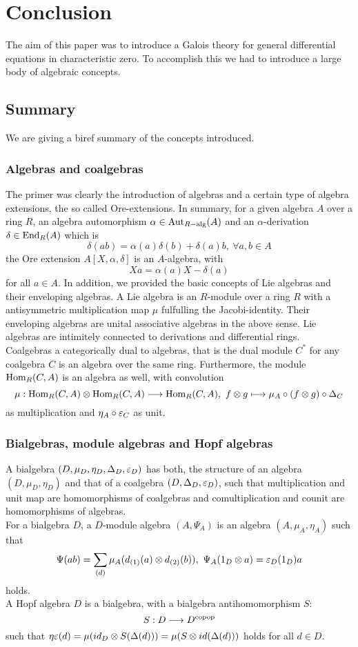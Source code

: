 \section{Conclusion}
The aim of this paper was to introduce a Galois theory for general differential equations in characteristic zero. To accomplish this we had to introduce a large body of algebraic concepts.
\subsection{Summary}
We are giving a biref summary of the concepts introduced.
\subsubsection{Algebras and coalgebras}
The primer was clearly the introduction of algebras and a certain type of algebra extensions, the so called Ore-extensions. In summary, for a given algebra $A$ over a ring $R$, an algebra automorphism $\alpha \in \mathrm{Aut}_{R-\mathrm{alg}}(A)$ and an $\alpha$-derivation $\delta \in \mathrm{End}_R(A)$ which is
$$\delta(a b) = \alpha(a) \delta(b) + \delta(a) b,\ \forall a, b \in A$$
the Ore extension $A[X,\alpha,\delta]$ is an $A$-algebra, with
$$X a = \alpha(a) X - \delta(a)$$
for all $a \in A$. In addition, we provided the basic concepts of Lie algebras and their enveloping algebras. A Lie algebra is an $R$-module over a ring $R$ with a antisymmetric multiplication map $\mu$ fulfulling the Jacobi-identity. Their enveloping algebras are unital associative algebras in the above sense. Lie algebras are intimitely connected to derivations and differential rings.\\
Coalgebras a categorically dual to algebras, that is the dual module $C^*$ for any coalgebra $C$ is an algebra over the same ring. Furthermore, the module $\mathrm{Hom}_R(C,A)$ is an algebra as well, with convolution
$$\mu : \mathrm{Hom}_R(C,A) \otimes \mathrm{Hom}_R(C,A) \longrightarrow \mathrm{Hom}_R(C,A),\ f \otimes g \longmapsto \mu_A \circ (f \otimes g) \circ \Delta_C$$
as multiplication and $\eta_A \circ \varepsilon_C$ as unit.
\subsubsection{Bialgebras, module algebras and Hopf algebras}
A bialgebra $(D,\mu_D,\eta_D,\Delta_D,\varepsilon_D)$ has both, the structure of an algebra $(D,\mu_D,\eta_D)$ and that of a coalgebra $(D,\Delta_D,\varepsilon_D)$, such that multiplication and unit map are homomorphisms of coalgebras and comultiplication and counit are homomorphisms of algebras.\\
For a bialgebra $D$, a $D$-module algebra $(A,\Psi_A)$ is an algebra $(A,\mu_A,\eta_A)$ such that
$$\Psi (a b) = \sum_{(d)} \mu_A(d_{(1)}(a) \otimes d_{(2)}(b)),\ \Psi_A(1_D \otimes a) = \varepsilon_D(1_D) a$$
holds.\\
A Hopf algebra $D$ is a bialgebra, with a bialgebra antihomomorphism $S$:
$$S : D \longrightarrow D^{\mathrm{copop}}$$
such that $\eta \varepsilon(d) = \mu(id_D \otimes S(\Delta(d))) = \mu(S \otimes id(\Delta(d)))$ holds for all $d \in D$.
